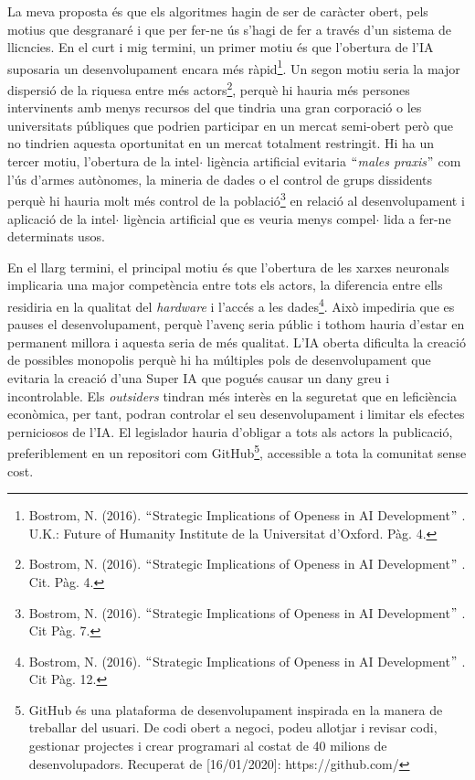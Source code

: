 \documentclass[12pt]{article}
\renewcommand{\_}{\kern-1.5pt\textunderscore\kern-1.5pt}
\begin{document}
\begin{itemize}
\vspace{\baselineskip}
\begin{justify}
La meva proposta és que els algoritmes hagin de ser de caràcter obert,  pels motius que desgranaré i  que per fer-ne ús s’hagi de fer a través d’un sistema de llicncies.  En el curt i mig termini, un primer motiu és que l’obertura de l’IA suposaria un desenvolupament encara més ràpid\footnote{ Bostrom, N. (2016). $``$Strategic Implications of Openess in AI Development$"$ . U.K.: Future of Humanity Institute de la Universitat d’Oxford. Pàg. 4.  }. Un segon motiu seria la major dispersió de la riquesa entre més actors\footnote{ Bostrom, N. (2016). $``$Strategic Implications of Openess in AI Development$"$ . Cit. Pàg. 4. }, perquè hi hauria més persones intervinents amb menys recursos del que tindria una gran corporació o les universitats públiques que podrien participar en un mercat semi-obert però que no tindrien aquesta oportunitat en un mercat totalment restringit. Hi ha un tercer motiu, l’obertura de la intel$ \cdot $ ligència artificial evitaria \textit{$``$males praxis$"$ } com l’ús d’armes autònomes, la mineria de dades o el control de grups dissidents perquè hi hauria molt més control de la població\footnote{ Bostrom, N. (2016). $``$Strategic Implications of Openess in AI Development$"$ . Cit Pàg. 7. } en relació al desenvolupament i aplicació de la intel$ \cdot $ ligència artificial que es veuria menys compel$ \cdot $ lida a fer-ne determinats usos.
\end{justify}\par


\vspace{\baselineskip}
\begin{justify}
En el llarg termini, el principal motiu és que l’obertura de les xarxes neuronals implicaria una major competència entre tots els actors, la diferencia entre ells residiria en la qualitat del \textit{hardware }i l’accés a les dades\footnote{ Bostrom, N. (2016). $``$Strategic Implications of Openess in AI Development$"$ . Cit Pàg. 12. }. Això impediria que es pauses el desenvolupament, perquè  l’avenç seria públic i tothom hauria d’estar en permanent millora i aquesta seria de més qualitat. L’IA oberta dificulta la creació de possibles monopolis perquè hi ha múltiples pols de desenvolupament que evitaria la creació d’una Super IA que pogués causar un dany greu i incontrolable. Els \textit{outsiders} tindran més interès en la seguretat que en leficiència econòmica, per tant, podran controlar el seu desenvolupament i limitar els efectes perniciosos de l’IA. El legislador hauria d’obligar a tots als actors la publicació, preferiblement en un repositori com GitHub\footnote{ GitHub és una plataforma de desenvolupament inspirada en la manera de treballar del usuari. De codi obert a negoci, podeu allotjar i revisar codi, gestionar projectes i crear programari al costat de 40 milions de desenvolupadors. Recuperat de [16/01/2020]: https://github.com/ }, accessible a tota la comunitat sense cost.
\end{justify}\par



\end{itemize}
\end{document}
